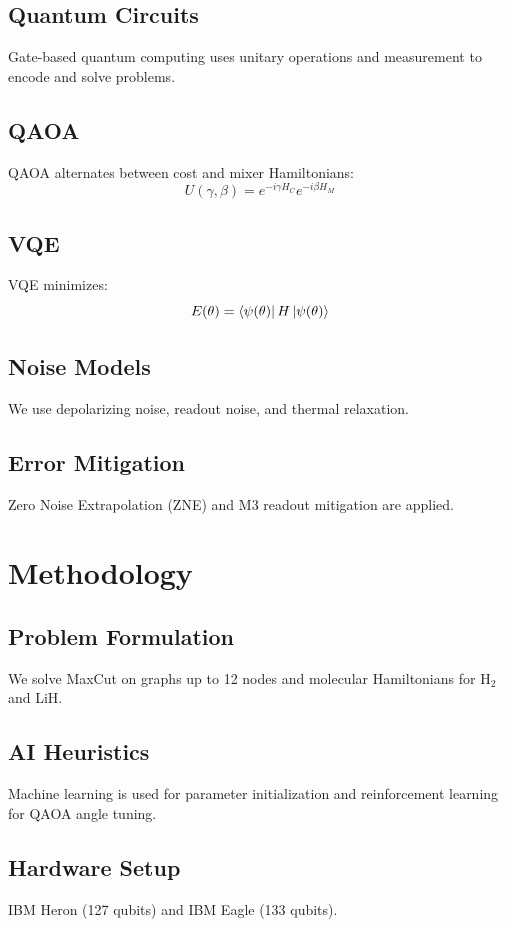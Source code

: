 \documentclass[12pt]{article}
\begin{document}
\subsection{Quantum Circuits}
Gate-based quantum computing uses unitary operations and measurement to encode and solve problems.

\subsection{QAOA}
QAOA alternates between cost and mixer Hamiltonians:
\[
U(\gamma, \beta) = e^{-i\gamma H_C} e^{-i\beta H_M}
\]

\subsection{VQE}
VQE minimizes:
\[
E(\theta) = \bra{\psi(\theta)} H \ket{\psi(\theta)}
\]

\subsection{Noise Models}
We use depolarizing noise, readout noise, and thermal relaxation.

\subsection{Error Mitigation}
Zero Noise Extrapolation (ZNE) and M3 readout mitigation are applied.

\section{Methodology}
\subsection{Problem Formulation}
We solve MaxCut on graphs up to 12 nodes and molecular Hamiltonians for H$_2$ and LiH.

\subsection{AI Heuristics}
Machine learning is used for parameter initialization and reinforcement learning for QAOA angle tuning.

\subsection{Hardware Setup}
IBM Heron (127 qubits) and IBM Eagle (133 qubits).
\end{document}
